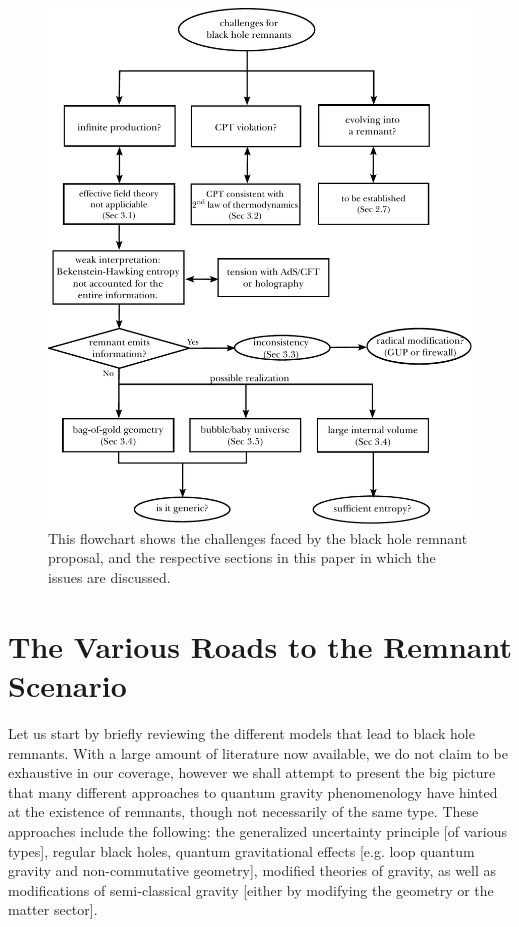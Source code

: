 \documentclass[12pt]{article}
\newcommand{\2}{$^2$}
\newcommand{\3}{$^3$}
\newcommand{\4}{$_4$}
\newcommand{\5}{$_5$}
\begin{document}
\begin{figure}
\begin{center}
\includegraphics[scale=0.72]{flowchart_2.pdf}
\caption{\label{flowchart2} This flowchart shows the challenges faced by the black hole remnant proposal, and the respective sections in this paper in which the issues are discussed.}
\end{center}
\end{figure}



\section{The Various Roads to the Remnant Scenario}

Let us start by briefly reviewing the different models that lead to black hole remnants. With a large amount of literature now available, we do not claim to be exhaustive in our coverage, however we shall attempt to present the big picture that many different approaches to quantum gravity phenomenology have hinted at the existence of remnants, though not necessarily of the same type. These approaches include the following: the generalized uncertainty principle [of various types], regular black holes, quantum gravitational effects [e.g. loop quantum gravity and non-commutative geometry], modified theories of gravity, as well as modifications of semi-classical gravity [either by modifying the geometry or the matter sector]. 
\end{document}

